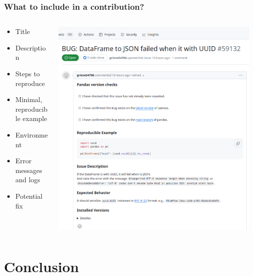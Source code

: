 \documentclass{beamer}
\begin{document}
	\begin{frame}
		\frametitle{What to include in a contribution?}
		\begin{columns}
			\begin{column}{0.35\textwidth}
				\begin{itemize}
					\item Title
					\item Description
					\item Steps to reproduce
					\item Minimal, reproducible example
					\item Environment
					\item Error messages and logs
					\item Potential fix
				\end{itemize}
			\end{column}
			\begin{column}{0.65\textwidth}
				\includegraphics[width=\textwidth]{pandas_issue}
			\end{column}
		\end{columns}
	\end{frame}
	
	\section{Conclusion}
	
\end{document}
